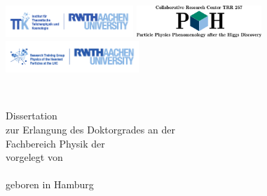 
\begin{titlepage}
    \begin{addmargin}[-0cm]{-0.5cm}
	    \begin{center}

	        \includegraphics[height=1.2cm]{logos/rwth_ttk_de_rgb.pdf}
	        \hfill
	        \includegraphics[height=1.2cm]{logos/p3h_logo_exa_sites_vertical_text.png}
	        \hfill
					\includegraphics[height=1.2cm]{logos/rwth_gk_physik_der_schwersten_teilchen_lhc_logo_en_rgb.pdf}
	        \hfill
	        \vfill

	        \begingroup
	        	\LARGE
	        	\color{RWTHblau}
	        	{\scshape \myTitle}\\
	        \endgroup

	        \vspace{2.5cm}
	        \Large
	        {Dissertation}\\
	        \vspace{0.5cm}
	        {zur Erlangung des Doktorgrades an der \myFaculty}\\
			\vspace{0.5cm}
	        {Fachbereich Physik der \myUniGenitiv}\\
	        \vspace{0.5cm}
	        {vorgelegt von}\\
	        \vspace{1.5cm}
	        \Large
	        {\scshape \myName} \\
					\vspace{1.5cm}
					\Large
					{geboren in Hamburg} \\
	        \Large

	        \vfill
	        {\myLocation}\\
	        {\myTime}\\

	        \vfill


    	\end{center}
	\end{addmargin}
\end{titlepage}
